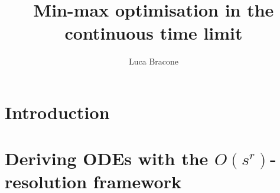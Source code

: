 \documentclass{scrreprt}
\title{Min-max optimisation in the continuous time limit}
\author{Luca Bracone}
\theoremstyle{remark}
\begin{document}
\maketitle

\chapter{Introduction}

\chapter{Deriving ODEs with the $O(s^r)$-resolution framework}\label{chap:osr}




\end{document}
